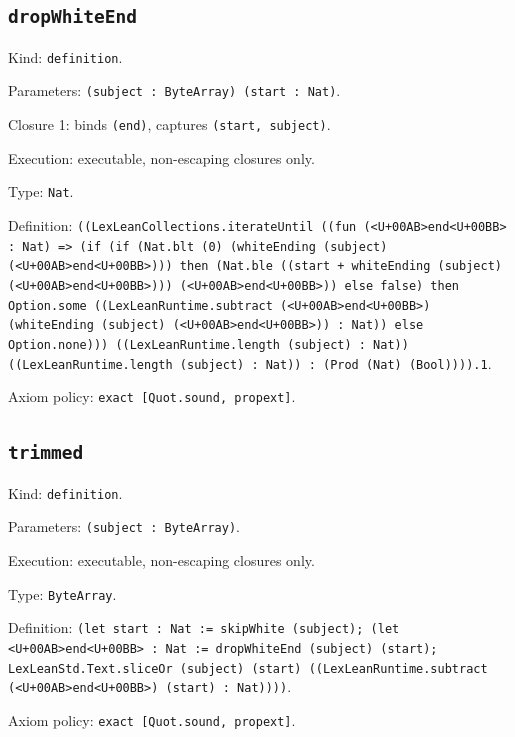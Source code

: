 \documentclass[11pt]{article}
\begin{document}
\subsection*{\texttt{dropWhiteEnd}}
\noindent Kind: \texttt{definition}.\par
\noindent Parameters: \texttt{(subject : ByteArray) (start : Nat)}.\par
\noindent Closure 1: binds \texttt{(end)}, captures \texttt{(start, subject)}.\par
\noindent Execution: executable, non-escaping closures only.\par
\noindent Type: \texttt{Nat}.\par
\noindent Definition: \texttt{((LexLeanCollections.iterateUntil ((fun (<U+00AB>end<U+00BB> : Nat) => (if (if (Nat.blt (0) (whiteEnding (subject) (<U+00AB>end<U+00BB>))) then (Nat.ble ((start + whiteEnding (subject) (<U+00AB>end<U+00BB>))) (<U+00AB>end<U+00BB>)) else false) then Option.some ((LexLeanRuntime.subtract (<U+00AB>end<U+00BB>) (whiteEnding (subject) (<U+00AB>end<U+00BB>)) : Nat)) else Option.none))) ((LexLeanRuntime.length (subject) : Nat)) ((LexLeanRuntime.length (subject) : Nat)) : (Prod (Nat) (Bool)))).1}.\par
\noindent Axiom policy: \texttt{exact [Quot.sound, propext]}.\par
\subsection*{\texttt{trimmed}}
\noindent Kind: \texttt{definition}.\par
\noindent Parameters: \texttt{(subject : ByteArray)}.\par
\noindent Execution: executable, non-escaping closures only.\par
\noindent Type: \texttt{ByteArray}.\par
\noindent Definition: \texttt{(let start : Nat := skipWhite (subject); (let <U+00AB>end<U+00BB> : Nat := dropWhiteEnd (subject) (start); LexLeanStd.Text.sliceOr (subject) (start) ((LexLeanRuntime.subtract (<U+00AB>end<U+00BB>) (start) : Nat))))}.\par
\noindent Axiom policy: \texttt{exact [Quot.sound, propext]}.\par
\end{document}
